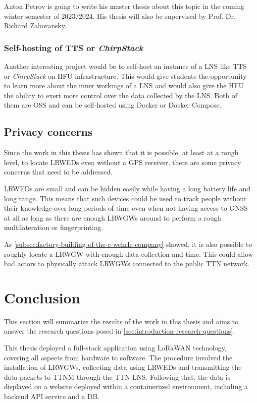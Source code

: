 Anton Petrov is going to write his master thesis about this topic in the coming winter semester of 2023/2024.
His thesis will also be supervised by Prof. Dr. Richard Zahoransky.

\subsubsection{Self-hosting of \acl{TTS} or \emph{ChirpStack}}

Another interesting project would be to self-host an instance of a \ac{LNS} like \ac{TTS} or \emph{ChirpStack} on \ac{HFU} infrastructure.
This would give students the opportunity to learn more about the inner workings of a \ac{LNS} and would also give the \ac{HFU} the ability to exert more control over the data collected by the \ac{LNS}.
Both of them are \ac{OSS} and can be self-hosted using Docker or Docker Compose.

\subsection{Privacy concerns}

Since the work in this thesis has shown that it is possible, at least at a rough level, to locate \aclp{LRWED} even without a \ac{GPS} receiver, there are some privacy concerns that need to be addressed.

\aclp{LRWED} are small and can be hidden easily while having a long battery life and long range.
This means that such devices could be used to track people without their knowledge over long periods of time even when not having access to \ac{GNSS} at all as long as there are enough \aclp{LRWGW} around to perform a rough multilateration or fingerprinting.

As \cref{subsec:factory-building-of-the-e-wehrle-company} showed, it is also possible to roughly locate a \acl{LRWGW} with enough data collection and time.
This could allow bad actors to physically attack \aclp{LRWGW} connected to the public \ac{TTN} network.

\section{Conclusion}

This section will summarize the results of the work in this thesis and aims to answer the research questions posed in \cref{sec:introduction-research-questions}.

This thesis deployed a full-stack application using \ac{LoRaWAN} technology, covering all aspects from hardware to software.
The procedure involved the installation of \aclp{LRWGW}, collecting data using \aclp{LRWED} and transmitting the data packets to \acl{TTNM} through the \ac{TTN} \acl{LNS}.
Following that, the data is displayed on a website deployed within a containerized environment, including a backend \ac{API} service and a \acl{DB}.

